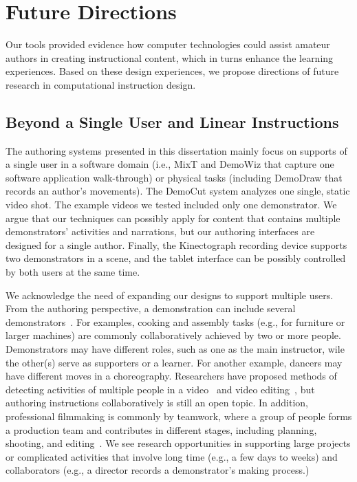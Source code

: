 
\section{Future Directions} %

Our tools provided evidence how computer technologies could assist amateur authors in creating instructional content, which in turns enhance the learning experiences. Based on these design experiences, we propose directions of future research in computational instruction design.

\subsection{Beyond a Single User and Linear Instructions}
The authoring systems presented in this dissertation mainly focus on supports of a single user in a software domain (i.e., MixT and DemoWiz that capture one software application walk-through) or physical tasks (including DemoDraw that records an author's movements).
%
The DemoCut system analyzes one single, static video shot. The example videos we tested included only one demonstrator. We argue that our techniques can possibly apply for content that contains multiple demonstrators' activities and narrations, but our authoring interfaces are designed for a single author.
%
Finally, the Kinectograph recording device supports two demonstrators in a scene, and the tablet interface can be possibly controlled by both users at the same time.

We acknowledge the need of expanding our designs to support multiple users. From the authoring perspective, a demonstration can include several demonstrators~. For examples, cooking and assembly tasks (e.g., for furniture or larger machines) are commonly collaboratively achieved by two or more people. Demonstrators may have different roles, such as one as the main instructor, wile the other(s) serve as supporters or a learner. For another example, dancers may have different moves in a choreography.
%
Researchers have proposed methods of detecting activities of multiple people in a video~ and video editing~, but authoring instructions collaboratively is still an open topic. In addition, professional filmmaking is commonly by teamwork, where a group of people forms a production team and contributes in different stages, including planning, shooting, and editing~. We see research opportunities in supporting large projects or complicated activities that involve long time (e.g., a few days to weeks) and collaborators (e.g., a director records a demonstrator's making process.)

